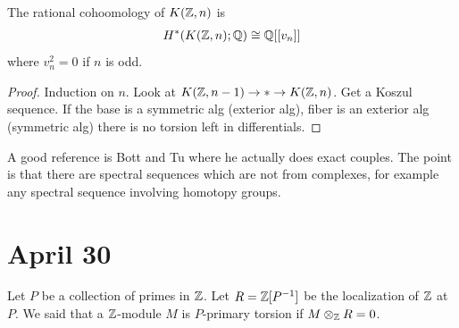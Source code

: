 \documentclass[12pt]{article}
\begin{document}
\begin{theorem}
    The rational cohoomology of $K(\mathbb{Z},n)$ is \begin{align*}
        H^*(K(\mathbb{Z},n);\mathbb{Q}) \cong \mathbb{Q}[[v_n]]
    \end{align*} where $v_n^2 = 0$ if $n$ is odd.
\end{theorem}

\begin{proof}
    Induction on $n$. Look at $K(\mathbb{Z},n-1) \to * \to K(\mathbb{Z},n)$. Get a Koszul sequence. If the base is a symmetric alg (exterior alg), fiber is an exterior alg (symmetric alg) there is no torsion left in differentials.
\end{proof}
A good reference is Bott and Tu where he actually does exact couples. The point is that there are spectral sequences which are not from complexes, for example any spectral sequence involving homotopy groups. 

\section{April 30}
Let $P$ be a collection of primes in $\mathbb{Z}$. Let $R = \mathbb{Z}[P^{-1}]$ be the localization of $\mathbb{Z}$ at $P$. We said that a $\mathbb{Z}$-module $M$ is $P$-primary torsion if $M \otimes_{\mathbb{Z}} R = 0$. 
\end{document}
